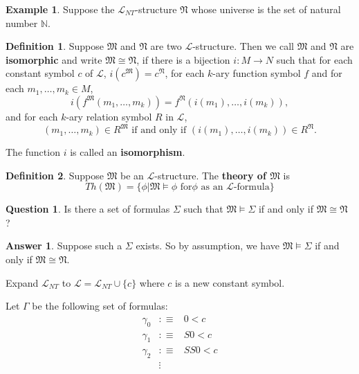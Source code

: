 \documentclass[11pt,letterpaper]{book}
\theoremstyle{definition}
\newtheorem{definition}{Definition}[section]
\newtheorem{example}{Example}[section]
\newtheorem{question}{Question}[section]
\newtheorem{answer}{Answer}[section]
\begin{document}
\begin{example}
\label{example:non_axiomized_natural_numbers}
Suppose the $\mathcal{L}_{NT}$-structure $\mathfrak{N}$ whose universe
is the set of natural number $\mathbb{N}$.

\begin{definition}
Suppose $\mathfrak{M}$ and $\mathfrak{N}$ are two
$\mathcal{L}$-structure. Then we call $\mathfrak{M}$ and $\mathfrak{N}$
are \textbf{isomorphic} and write $\mathfrak{M} \cong \mathfrak{N} $,
if there is a bijection $i: M \rightarrow N $ such that for each
constant symbol $c$ of $\mathcal{L}$, $i ( c^{\mathfrak{M}} ) =
c^{\mathfrak{N}}$, for each $k$-ary function symbol $f$ and for each
$m_1, \ldots, m_k \in M$, $$i ( f^{\mathfrak{M}} (m_1, \ldots, m_k) ) =
f^{\mathfrak{N}} ( i(m_1), \ldots, i(m_k) ), $$
and for each $k$-ary relation symbol $R$ in $\mathcal{L}$, $$(m_1,
\ldots, m_k) \in R^{\mathfrak{M}} \text{ if and only if } (i(m_1),
\ldots, i(m_k)) \in R^{\mathfrak{N}}  . $$

The function $i$ is called an \textbf{isomorphism}.

\end{definition}

\begin{definition}
Suppose $\mathfrak{M}$ be an $\mathcal{L}$-structure. The \textbf{theory
of $\mathfrak{M}$} is
\begin{equation}
Th(\mathfrak{M}) = \{ \phi \big| \mathfrak{M} \models \phi \text{ for
$\phi$ as an $\mathcal{L}$-formula} \} \nonumber
\end{equation}
\end{definition}



\begin{question}
Is there a set of formulas $\Sigma$ such that $\mathfrak{M} \models
\Sigma $ if and only if $\mathfrak{M} \cong \mathfrak{N} $ ?
\end{question}

\begin{answer}
Suppose such a $\Sigma$ exists. So by assumption, we have $\mathfrak{M}
\models \Sigma $ if and only if $\mathfrak{M} \cong \mathfrak{N} $.

Expand $\mathcal{L}_{NT}$ to $\mathcal{L} = \mathcal{L}_{NT} \cup \{ c
\} $ where $c$ is a new constant symbol.

Let $\Gamma$ be the following set of formulas:
\begin{eqnarray*}
\gamma_0 & :\equiv & 0 < c \\
\gamma_1 & :\equiv & S 0 < c \\
\gamma_2 & :\equiv & SS0 < c \\
     & \vdots &
\end{eqnarray*}


\end{answer}
\end{example}
\end{document}
